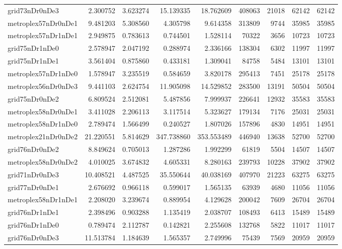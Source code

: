 \begin{longtable}{|l|r|r|r|r|r|r|r|r|}
grid73nDr0nDe3 & 2.300752 & 3.623274 & 15.139335 & 18.762609 & 408063 & 21018 & 62142 & 62142 \\
metroplex57nDr0nDe1 & 9.481203 & 5.308560 & 4.305798 & 9.614358 & 313809 & 9744 & 35985 & 35985 \\
metroplex57nDr1nDe1 & 2.949875 & 0.783613 & 0.744501 & 1.528114 & 70322 & 3656 & 10723 & 10723 \\
grid75nDr1nDe0 & 2.578947 & 2.047192 & 0.288974 & 2.336166 & 138304 & 6302 & 11997 & 11997 \\
grid75nDr1nDe1 & 3.561404 & 0.875860 & 0.433181 & 1.309041 & 84758 & 5484 & 13101 & 13101 \\
metroplex57nDr1nDe0 & 1.578947 & 3.235519 & 0.584659 & 3.820178 & 295413 & 7451 & 25178 & 25178 \\
metroplex56nDr0nDe3 & 9.441103 & 2.624754 & 11.905098 & 14.529852 & 283500 & 13191 & 50504 & 50504 \\
grid75nDr0nDe2 & 6.809524 & 2.512081 & 5.487856 & 7.999937 & 226641 & 12932 & 35583 & 35583 \\
metroplex58nDr0nDe1 & 3.411028 & 2.206113 & 3.117514 & 5.323627 & 179134 & 7176 & 25031 & 25031 \\
metroplex58nDr1nDe0 & 2.789474 & 1.566499 & 0.240527 & 1.807026 & 157896 & 4830 & 14951 & 14951 \\
metroplex21nDr0nDe2 & 21.220551 & 5.814629 & 347.738860 & 353.553489 & 446940 & 13638 & 52700 & 52700 \\
grid76nDr0nDe2 & 8.849624 & 0.705013 & 1.287286 & 1.992299 & 61819 & 5504 & 14507 & 14507 \\
metroplex58nDr0nDe2 & 4.010025 & 3.674832 & 4.605331 & 8.280163 & 239793 & 10228 & 37902 & 37902 \\
grid71nDr0nDe3 & 10.408521 & 4.487525 & 35.550644 & 40.038169 & 407970 & 21223 & 63275 & 63275 \\
grid77nDr0nDe1 & 2.676692 & 0.966118 & 0.599017 & 1.565135 & 63939 & 4680 & 11056 & 11056 \\
metroplex58nDr1nDe1 & 2.208020 & 3.239674 & 0.889954 & 4.129628 & 200042 & 7609 & 26704 & 26704 \\
grid76nDr1nDe1 & 2.398496 & 0.903288 & 1.135419 & 2.038707 & 108493 & 6413 & 15489 & 15489 \\
grid76nDr1nDe0 & 0.789474 & 2.112787 & 0.142821 & 2.255608 & 132768 & 5822 & 11017 & 11017 \\
grid76nDr0nDe3 & 11.513784 & 1.184639 & 1.565357 & 2.749996 & 75439 & 7569 & 20959 & 20959 \\

\end{longtable}

